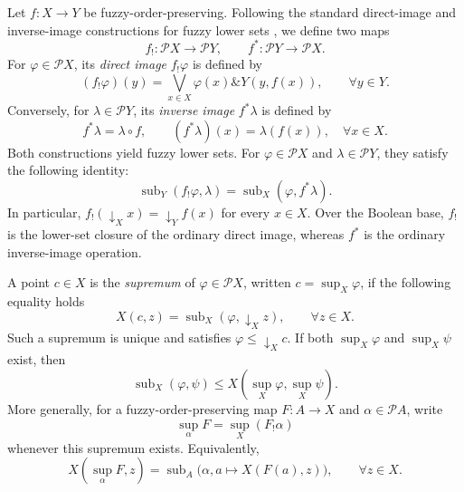 \documentclass[preprint,3p,times]{elsarticle}
\theoremstyle{definition}
\theoremstyle{remark}
\newcommand{\Psh}{\mathcal{P}}
\newcommand{\supop}{\operatorname{sup}}
\newcommand{\subdeg}{\operatorname{sub}}
\newcommand{\tn}{\mathbin{\&}}
\numberwithin{equation}{section}
\begin{document}
Let \(f\colon X\to Y\) be fuzzy-order-preserving. Following the standard direct-image and inverse-image constructions for fuzzy lower sets
\cite{LaiZhangZhang2020},
we define two maps
\[
f_!\colon\Psh X\to\Psh Y,
\qquad
f^*\colon\Psh Y\to\Psh X.
\]
For \(\varphi\in\Psh X\), its \emph{direct image}
\(f_!\varphi\) is defined by
\begin{equation}\label{eq:direct-image}
(f_!\varphi)(y)
=
\bigvee_{x\in X}
\varphi(x)\tn Y(y,f(x)),
\qquad \forall y\in Y.
\end{equation}
Conversely, for \(\lambda\in\Psh Y\), its \emph{inverse image} \(f^*\lambda\) is defined by
\begin{equation}\label{eq:inverse-image}
f^*\lambda=\lambda\circ f,
\qquad
(f^*\lambda)(x)=\lambda(f(x)),
\quad \forall x\in X.
\end{equation}
Both constructions yield fuzzy lower sets. For \(\varphi\in\Psh X\) and \(\lambda\in\Psh Y\), they satisfy the following identity:
\begin{equation}\label{eq:direct-image-adjunction}
\subdeg_Y(f_!\varphi,\lambda)
=
\subdeg_X(\varphi,f^*\lambda).
\end{equation}
In particular, \(f_!(\downarrow_X x)=\downarrow_Y f(x)\) for every \(x\in X\). Over the Boolean base, \(f_!\) is the lower-set closure of the ordinary direct image, whereas \(f^*\) is the ordinary inverse-image operation.

A point \(c\in X\) is the \emph{supremum} of \(\varphi\in\Psh X\), written \(c=\supop_X\varphi\), if the following equality holds 
\begin{equation}\label{eq:fuzzy-supremum}
X(c,z)=\subdeg_X(\varphi,\downarrow_X z), \qquad\forall z\in X.
\end{equation}
Such a supremum is unique and satisfies \(\varphi\leq\downarrow_X c\). If both \(\supop_X\varphi\) and \(\supop_X\psi\) exist, then
\begin{equation}\label{eq:sup-order-preserving}
 \subdeg_X(\varphi,\psi)
 \leq X(\supop_X\varphi,\supop_X\psi).
\end{equation}
More generally, for a fuzzy-order-preserving map \(F\colon A\to X\) and \(\alpha\in\Psh A\), write \cite[Section~6]{Zhang2024}
\[
 \supop_\alpha F=\supop_X(F_!\alpha)
\]
whenever this supremum exists. Equivalently,
\begin{equation}\label{eq:weighted-supremum}
 X(\supop_\alpha F,z)
 =\subdeg_A\bigl(\alpha,a\mapsto X(F(a),z)\bigr),\qquad \forall z\in X.
\end{equation}
\end{document}
